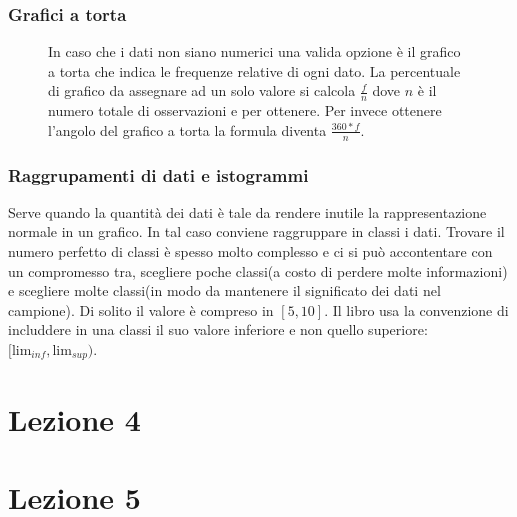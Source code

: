 \documentclass{article}
\begin{document}
\subsubsection*{Grafici a torta}

\begin{figure}[h]
    \begin{minipage}{0.20\textwidth} %
    \end{minipage}
    \hfill
    \begin{minipage}{0.8\textwidth}

      In caso che i dati non siano numerici una valida opzione è il grafico a torta che indica le frequenze relative di ogni dato. La percentuale di grafico da assegnare ad un solo valore si calcola $\frac{f}{n}$ dove $n$ è il numero totale di osservazioni e per ottenere. Per invece ottenere l'angolo del grafico a torta la formula diventa $\frac{360*f}{n}$.
    \end{minipage}
\end{figure}

\subsubsection*{Raggrupamenti di dati e istogrammi}

 Serve quando la quantità dei dati è tale da rendere inutile la rappresentazione normale in un grafico. In tal caso conviene raggruppare in classi i dati. Trovare il numero perfetto di classi è spesso molto complesso e ci si può accontentare con un compromesso tra, scegliere poche classi(a costo di perdere molte informazioni) e scegliere molte classi(in modo da mantenere il significato dei dati nel campione). Di solito il valore è compreso in $[5,10]$. Il libro usa la convenzione di includdere in una classi il suo valore inferiore e non quello superiore: $[\text{lim}_{inf}, \text{lim}_{sup})$.

\section*{Lezione 4}

\section*{Lezione 5}
\end{document}
